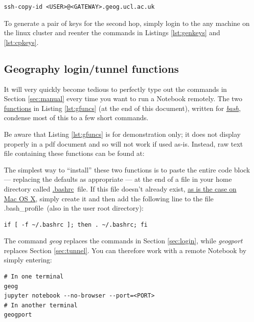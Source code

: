 \documentclass[a4paper]{article}
\begin{document}
\begin{lstlisting}[caption={Copy public key to geography file system}, label={lst:cpkeys}]
ssh-copy-id <USER>@<GATEWAY>.geog.ucl.ac.uk
\end{lstlisting}

To generate a pair of keys for the second hop, simply login to the any machine on the linux cluster and reenter the commands in Listings \ref{lst:genkeys} and \ref{lst:cpkeys}.

\subsection{Geography login/tunnel functions}
\label{sec:gfuncs}

It will very quickly become tedious to perfectly type out the commands in Section \ref{sec:manual} every time you want to run a Notebook remotely.
The two \href{https://www.shellscript.sh/functions.html}{functions} in Listing \ref{lst:gfuncs} (at the end of this document), written for \href{http://cs.lmu.edu/~ray/notes/bash/}{\emph{bash}}, condense most of this to a few short commands.

Be aware that Listing \ref{lst:gfuncs} is for demonstration only; it does not display properly in a pdf document and so will not work if used as-is.
Instead, raw text file containing these functions can be found at:


The simplest way to ``install'' these two functions is to paste the entire code block --- replacing the defaults as appropriate --- at the end of a file in your home directory called \href{http://superuser.com/questions/49289/what-is-the-bashrc-file}{.bashrc}~file.
If this file doesn't already exist, \href{http://apple.stackexchange.com/a/119714}{as is the case on Mac OS X}, simply create it and then add the following line to the file .bash\_profile~(also in the user root directory):

\begin{lstlisting}[caption={Source .bashrc on startup}, label={lst:srcbashrc}]
if [ -f ~/.bashrc ]; then . ~/.bashrc; fi
\end{lstlisting}

The command \emph{geog} replaces the commands in Section \ref{sec:login}, while \emph{geogport} replaces Section \ref{sec:tunnel}.
You can therefore work with a remote Notebook by simply entering:
\begin{lstlisting}[caption={Set up and tunnel to remote Notebook server}, label={lst:usegfuncs}]
# In one terminal
geog
jupyter notebook --no-browser --port=<PORT>
# In another terminal
geogport
\end{lstlisting}
\end{document}

